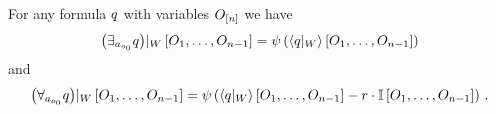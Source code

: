 \begin{theorem}
	For any formula $q$ with variables $O_{[n]}$ we have
		\begin{align}
			{\left(\exists_{a_{o_{0}}}  q\right)}|_{W} \left[O_{1},\ldots,O_{n-1}\right] = 
			\psi\left(
			\left\langle {q}|_{W}\right\rangle \left[ O_{1},\ldots,O_{n-1} \right]
			\right)
		\end{align}
	and
		\begin{align}
			{\left(\forall_{a_{o_{0}}} q\right)}|_{W} \left[O_{1},\ldots,O_{n-1}\right]= 
			\psi\left(
			\left\langle {q}|_{W}\right\rangle \left[ O_{1},\ldots,O_{n-1} \right]
			- r \cdot \mathbb{I}\left[O_{1},\ldots,O_{n-1}\right]
			\right) \, . 
		\end{align}
\end{theorem}
